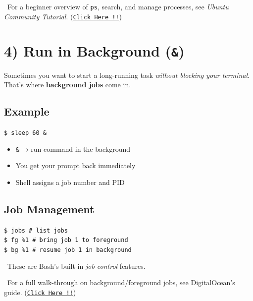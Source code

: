 \documentclass[12pt]{article}
\newcommand{\arrowicon}{\faArrowRight}
\begin{document}
\begin{infobox}
\arrowicon\ For a beginner overview of \texttt{ps}, search, and manage processes, see \textit{Ubuntu Community Tutorial}. (\href{https://discourse.ubuntu.com/t/viewing-and-monitoring-processes-in-linux/26024}{\texttt{Click Here !!}})
\end{infobox}

\section*{4) Run in Background (\texttt{\&})}

Sometimes you want to start a long-running task \textit{without blocking your terminal}. That's where \textbf{background jobs} come in.

\subsection*{Example}

\begin{highlightbox}
\texttt{\$ sleep 60 \&}
\end{highlightbox}

\begin{itemize}
    \item \texttt{\&} → run command in the background
    \item You get your prompt back immediately
    \item Shell assigns a job number and PID
\end{itemize}

\subsection*{Job Management}

\begin{highlightbox}
\texttt{\$ jobs            \# list jobs}\\
\texttt{\$ fg \%1           \# bring job 1 to foreground}\\
\texttt{\$ bg \%1           \# resume job 1 in background}
\end{highlightbox}

\begin{infobox}
\faLocationArrow\ These are Bash's built-in \textit{job control} features.
\end{infobox}

\begin{infobox}
\arrowicon\ For a full walk-through on background/foreground jobs, see DigitalOcean's guide. (\href{https://www.digitalocean.com/community/tutorials/how-to-use-bash-s-job-control-to-manage-foreground-and-background-processes}{\texttt{Click Here !!}})
\end{infobox}
\end{document}
